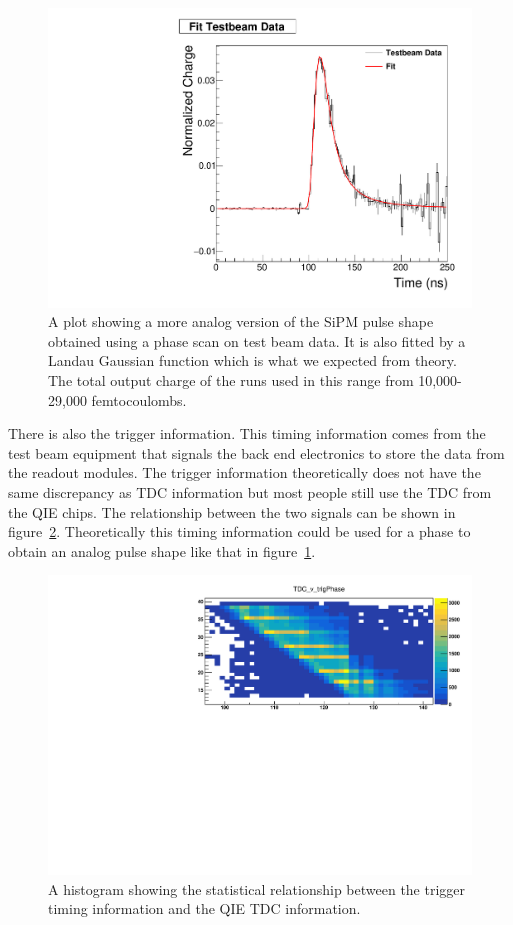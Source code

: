\begin{figure}
\centering
\includegraphics[width=0.8\linewidth]{Figures/FittedPlot.pdf}
\caption{A plot showing a more analog version of the SiPM pulse shape obtained using a phase scan on test beam data. It is also fitted by a Landau Gaussian function which is what we expected from theory. The total output charge of the runs used in this range from 10,000-29,000 femtocoulombs.}
\label{fig:fit}
\end{figure}

There is also the trigger information. This timing information comes from the test beam equipment that signals the back end electronics to store the data from the readout modules. The trigger information theoretically does not have the same discrepancy as TDC information but most people still use the TDC from the QIE chips. The relationship between the two signals can be shown in figure~\ref{fig:tdc}. Theoretically this timing information could be used for a phase to obtain an analog pulse shape like that in figure~\ref{fig:fit}.

\begin{figure}
\centering
\includegraphics[width=\linewidth]{Figures/zoom.pdf}
\caption{A histogram showing the statistical relationship between the trigger timing information and the QIE TDC information.}
\label{fig:tdc}
\end{figure}

